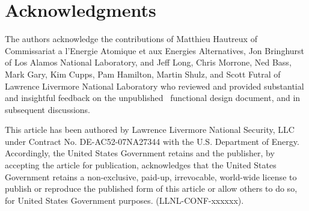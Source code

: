 \section {Acknowledgments}
The authors acknowledge the contributions of Matthieu Hautreux
of Commissariat a l'Energie Atomique et aux Energies Alternatives,
Jon Bringhurst of Los Alamos National Laboratory, and
Jeff Long, Chris Morrone, Ned Bass,
Mark Gary, Kim Cupps, Pam Hamilton, Martin Shulz, and Scott Futral
of Lawrence Livermore National Laboratory
who reviewed
and provided substantial and insightful feedback on the unpublished
\flux\ functional design document, and in subsequent discussions.
\ifcomments
{}
\fi

This article has been authored by Lawrence Livermore National Security, LLC
under Contract No. DE-AC52-07NA27344 with the U.S. Department of
Energy. Accordingly, the United States Government retains and the publisher,
by accepting the article for publication, acknowledges that the United States
Government retains a non-exclusive, paid-up, irrevocable, world-wide license
to publish or reproduce the published form of this article or allow others to
do so, for United States Government purposes. (LLNL-CONF-xxxxxx).

